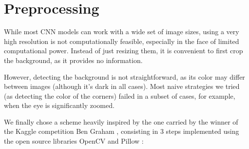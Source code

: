\section{Preprocessing}
While most CNN models can work with a wide set of image sizes, using a very high resolution is not computationally feasible, especially in the face of limited computational power. Instead of just resizing them, it is convenient to first crop the background, as it provides no information.

However, detecting the background is not straightforward, as its color may differ between images (although it's dark in all cases). Most naive strategies we tried (as detecting the color of the corners) failed in a subset of cases, for example, when the eye is significantly zoomed.

We finally chose a scheme heavily inspired by the one carried by the winner of the Kaggle competition Ben Graham \cite{competitionRep}, consisting in 3 steps implemented using the open source libraries OpenCV \cite{openCv} and Pillow \cite{pillow}:
